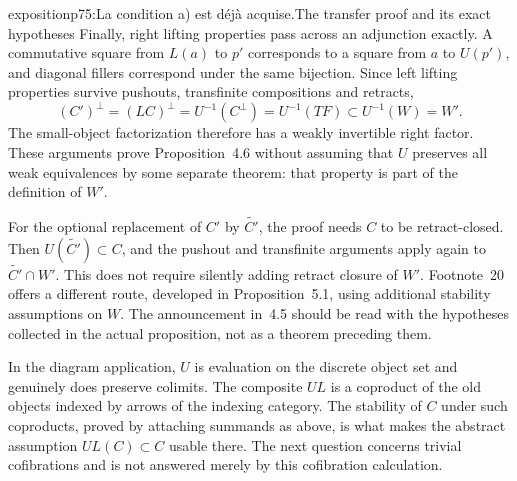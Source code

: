 \begin{dcomment}{exposition}{p75:La condition a) est déjà acquise.}{The transfer proof and its exact hypotheses}
Finally, right lifting properties pass across an adjunction exactly. A commutative square from $L(a)$ to $p'$ corresponds to a square from $a$ to $U(p')$, and diagonal fillers correspond under the same bijection. Since left lifting properties survive pushouts, transfinite compositions and retracts,
\[
 (C')^{\perp}=(LC)^{\perp}
 =U^{-1}(C^{\perp})=U^{-1}(TF)\subset U^{-1}(W)=W'.
\]
The small-object factorization therefore has a weakly invertible right factor. These arguments prove Proposition~4.6 without assuming that $U$ preserves all weak equivalences by some separate theorem: that property is part of the definition of $W'$.

For the optional replacement of $C'$ by $\widetilde{C'}$, the proof needs $C$ to be retract-closed. Then $U(\widetilde{C'})\subset C$, and the pushout and transfinite arguments apply again to $\widetilde{C'}\cap W'$. This does not require silently adding retract closure of $W'$. Footnote~20 offers a different route, developed in Proposition~5.1, using additional stability assumptions on $W$. The announcement in~4.5 should be read with the hypotheses collected in the actual proposition, not as a theorem preceding them.

In the diagram application, $U$ is evaluation on the discrete object set and genuinely does preserve colimits. The composite $UL$ is a coproduct of the old objects indexed by arrows of the indexing category. The stability of $C$ under such coproducts, proved by attaching summands as above, is what makes the abstract assumption $UL(C)\subset C$ usable there. The next question concerns trivial cofibrations and is not answered merely by this cofibration calculation.
\end{dcomment}

